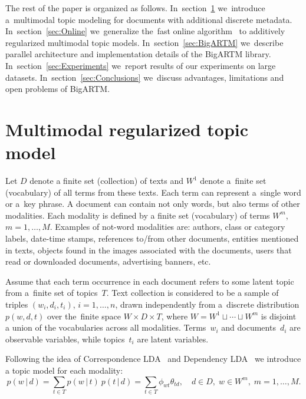 \documentclass[russian]{llncs}
\newcommand{\cond}{\mspace{3mu}{|}\mspace{3mu}}
\begin{document}
The rest of the paper is organized as follows.
In~section~\ref{sec:Multimodal}
we~introduce a~multimodal topic modeling for documents with additional discrete metadata.
In~section~\ref{sec:Online}
we~generalize the~fast online algorithm~\cite{hoffman10online} to additively regularized multimodal topic models.
In~section~\ref{sec:BigARTM}
we~describe parallel architecture and implementation details of the BigARTM library.
In~section~\ref{sec:Experiments}
we~report results of our experiments on large datasets.
In~section~\ref{sec:Conclusions}
we~discuss advantages, limitations and open problems of BigARTM.

\section{Multimodal regularized topic model}
\label{sec:Multimodal}


Let
$D$ denote a finite set (collection) of texts and
$W^1$ denote a~finite set (vocabulary) of all terms from these texts.
Each term can represent a~single word or a~key phrase.
A document can contain not only words, but also terms of other modalities.
Each modality is defined by a finite set (vocabulary) of terms $W^m$, ${m=1,\dots,M}$.
Examples of not-word modalities are:
authors,
class or category labels,
date-time stamps,
references to/from other documents,
entities mentioned in texts,
objects found in the images associated with the documents,
users that read or downloaded documents,
advertising banners,
etc.

Assume that
each term occurrence in each document refers to some latent topic from a~finite set of topics~$T$.
Text collection is considered to be a sample of triples
$(w_i,d_i,t_i)$,\; ${i=1,\dots,n}$,
drawn independently from a~discrete distribution $p(w,d,t)$ over the~finite space $W\times D \times T$,
where ${W=W^1\sqcup\cdots\sqcup W^m}$ is disjoint a union of the vocabularies across all modalities.
Terms~$w_i$ and documents~$d_i$ are observable variables,
while topics~$t_i$ are latent variables.

Following the idea of Correspondence LDA~\cite{blei03modeling}
and Dependency LDA~\cite{rubin12statistical}
we introduce a topic model for each modality:
\[
    p(w\cond d)
    = \sum_{t\in T} p(w\cond t)\: p(t\cond d)
    = \sum_{t\in T} \phi_{wt} \theta_{td},
    \quad
    d\in D,\; w\in W^m,\; m=1,\dots,M.
\]
\end{document}
